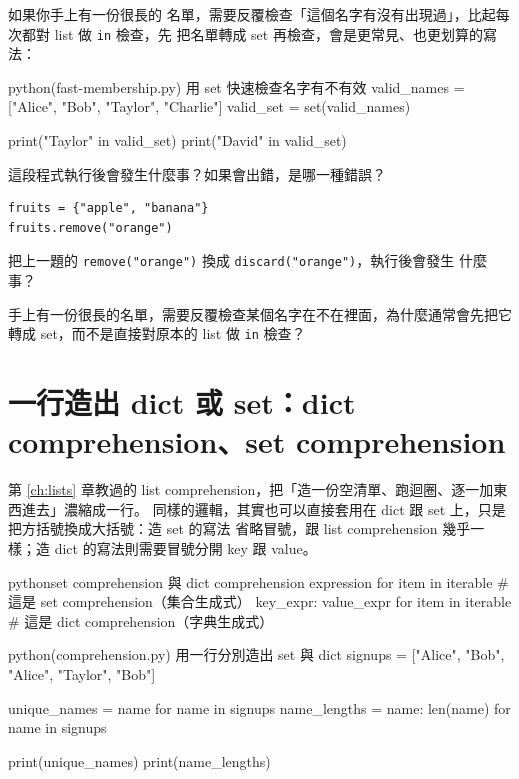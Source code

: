 如果你手上有一份很長的
名單，需要反覆檢查「這個名字有沒有出現過」，比起每次都對 list 做 \texttt{in} 檢查，先
把名單轉成 set 再檢查，會是更常見、也更划算的寫法：

\begin{example}{python}{(fast-membership.py) 用 set 快速檢查名字有不有效}
valid_names = ["Alice", "Bob", "Taylor", "Charlie"]
valid_set = set(valid_names)

print("Taylor" in valid_set)
print("David" in valid_set)
\end{example}


\begin{drills}[label=drills:set-membership]
\item 這段程式執行後會發生什麼事？如果會出錯，是哪一種錯誤？
\begin{verbatim}
fruits = {"apple", "banana"}
fruits.remove("orange")
\end{verbatim}
\item 把上一題的 \texttt{remove("orange")} 換成 \texttt{discard("orange")}，執行後會發生
什麼事？
\item 手上有一份很長的名單，需要反覆檢查某個名字在不在裡面，為什麼通常會先把它轉成
set，而不是直接對原本的 list 做 \texttt{in} 檢查？
\end{drills}

\section{一行造出 dict 或 set：dict comprehension、set comprehension}
\label{sec:comprehension}

第 \ref{ch:lists} 章教過的 list comprehension，把「造一份空清單、跑迴圈、逐一加東西進去」濃縮成一行。
同樣的邏輯，其實也可以直接套用在 dict 跟 set 上，只是把方括號換成大括號：造 set 的寫法
省略冒號，跟 list comprehension 幾乎一樣；造 dict 的寫法則需要冒號分開 key 跟 value。

\begin{code}{python}{set comprehension 與 dict comprehension}
{expression for item in iterable}              # 這是 set comprehension（集合生成式）
{key_expr: value_expr for item in iterable}    # 這是 dict comprehension（字典生成式）
\end{code}

\begin{example}{python}{(comprehension.py) 用一行分別造出 set 與 dict}
signups = ["Alice", "Bob", "Alice", "Taylor", "Bob"]

unique_names = {name for name in signups}
name_lengths = {name: len(name) for name in signups}

print(unique_names)
print(name_lengths)
\end{example}

